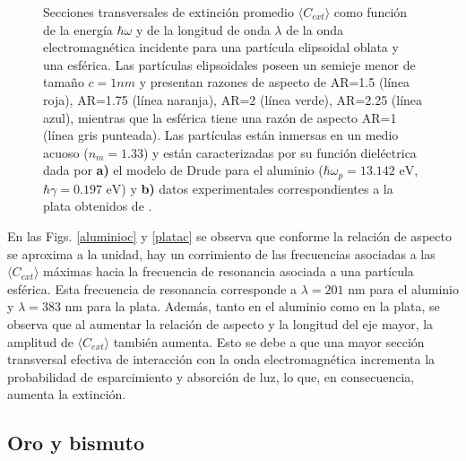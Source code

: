 \begin{figure}[h!]
	\quad%
	\caption{Secciones transversales de extinción promedio $\langle C_{ext}\rangle$ como función de la energía $\hbar\omega$ y de la longitud de onda $\lambda$ de la onda electromagnética incidente para una partícula elipsoidal oblata y una esférica. Las partículas elipsoidales poseen un semieje menor de tamaño $c=1nm$ y presentan razones de aspecto de AR=1.5 (línea roja), AR=1.75 (línea naranja), AR=2 (línea verde), AR=2.25 (línea azul), mientras que la esférica tiene una razón de aspecto AR=1 (línea gris punteada). Las partículas están inmersas en un medio acuoso ($n_m=1.33$) y están caracterizadas por su función dieléctrica dada por  \textbf{a)} el modelo de Drude para el aluminio ($\hbar\omega_p=13.142\text{ eV}$, $\hbar\gamma=0.197\text{ eV}$) y \textbf{b)} datos experimentales correspondientes a la plata obtenidos de \cite{Plata}.}\label{aluminioplatac}
\end{figure} 

 En las Figs. \ref{aluminioc}  y \ref{platac} se observa que conforme la relación de aspecto se aproxima a la unidad, hay un corrimiento de las frecuencias asociadas a las $\langle C_{ext}\rangle$ máximas hacia la frecuencia de resonancia asociada a una partícula esférica. Esta frecuencia de resonancia corresponde a $\lambda=201\text{ nm}$ para el aluminio y $\lambda=383\text{ nm}$ para la plata. Además, tanto en el aluminio como en la plata, se observa que al aumentar la relación de aspecto y la longitud del eje mayor, la amplitud de  $\langle C_{ext}\rangle$ también aumenta. Esto se debe a que una mayor sección transversal efectiva de interacción con la onda electromagnética incrementa la probabilidad de esparcimiento y absorción de luz, lo que, en consecuencia, aumenta la extinción.



\subsection*{Oro y bismuto}

